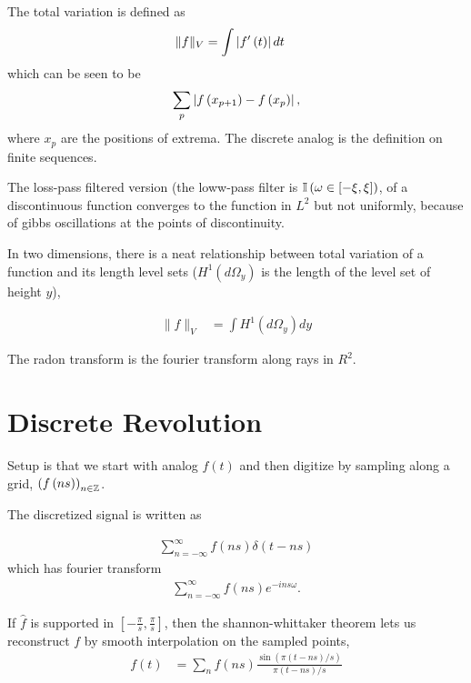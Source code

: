 \documentclass{article}
\begin{document}
The total variation is defined as
\begin{align}
\|f\|_{V} &= \int \left|f^{\prime}\left(t\right)\right|dt
\end{align}
which can be seen to be
\begin{align}
\sum_{p} \left|f\left(x_{p + 1}\right) - f\left(x_{p}\right)\right|,
\end{align}
where $x_{p}$ are the positions of extrema. The discrete analog is the
definition on finite sequences.

The loss-pass filtered version (the loww-pass filter is $\mathbb{I}\left({\omega\in
  \left[-\xi, \xi\right]}\right)$, of a discontinuous function converges to the
function in $L^{2}$ but not uniformly, because of gibbs oscillations at the
points of discontinuity.

In two dimensions, there is a neat relationship between total variation of a
function and its length level sets ($H^{1}\left(d\Omega_{y}\right)$ is the
length of the level set of height $y$),

\begin{align}
\|f\|_{V} &= \int H^{1}\left(d\Omega_{y}\right) dy
\end{align}

The radon transform is the fourier transform along rays in $R^{2}$.

\section{Discrete Revolution}
\label{sec:chapter_3}

Setup is that we start with analog $f\left(t\right)$ and then digitize by
sampling along a grid, $\left(f\left(ns\right)\right)_{n \in \mathbb{Z}}$.

The discretized signal is written as

\begin{align}
\sum_{n = -\infty}^{\infty} f\left(ns\right)\delta\left(t - ns\right)
\end{align}
which has fourier transform
\begin{align}
\sum_{n = -\infty}^{\infty} f\left(ns\right)e^{-ins\omega}.
\end{align}

If $\hat{f}$ is supported in $\left[-\frac{\pi}{s}, \frac{\pi}{s}\right]$, then
the shannon-whittaker theorem lets us reconstruct $f$ by smooth interpolation on
the sampled points,
\begin{align}
f\left(t\right) &= \sum_{n} f\left(ns\right) \frac{\sin\left(\pi\left(t - ns\right) / s\right)}{\pi \left(t - ns\right) / s}
\end{align}
\end{document}
